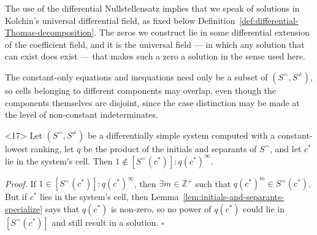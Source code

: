 \documentclass{article}
\theoremstyle{definition}
\theoremstyle{plain}
\newcommand{\qedbox}{\hspace*{\fill}\ensuremath{\square}}
\begin{document}
The use of the differential Nullstellensatz implies that we speak of solutions in Kolchin's universal
differential field, as fixed below
Definition~\ref{def:differential-Thomas-decomposition}.
The zeros we construct lie in some
differential extension of the coefficient field, and it is the universal field
--- in which any solution that can exist does exist --- that makes such a zero a
solution in the sense used here.

The constant-only equations and inequations need only be a subset of $(S^=, S^{\ne})$,
so cells belonging to different
components may overlap, even though the components themselves are disjoint,
since the case distinction may be made at the level of non-constant indeterminates.

\begin{lemma}<17>
\label{thm:cell-consistency-2}
  Let $(S^=, S^{\ne})$ be a differentially simple system computed with a
  constant-lowest ranking, let $q$ be the product of the initials and separants
  of $S^=$, and let $c^*$ lie in the system's cell.  Then
  $1 \notin [S^=(c^*)] : q(c^*)^\infty$.
\end{lemma}

{\it Proof.}
If $1 \in [S^=(c^*)] : q(c^*)^\infty$, then $\exists m\in\mathbb{Z}^+$ such that $q(c^*)^m \in S^=(c^*)$.
But if $c^*$ lies in the system's cell, then Lemma~\ref{lem:initials-and-separants-specialize}
says that $q(c^*)$ is non-zero, so no power of $q(c^*)$ could lie in $[S^=(c^*)]$
and still result in a solution.
\qedbox

\end{document}
